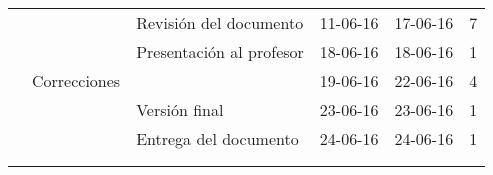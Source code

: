 \begin{table}[H]
{\begin{tabular}{lllccc}
					&							& Revisión del documento							& 11-06-16				& 17-06-16				& 7\\
					&							& Presentación al profesor							& 18-06-16				& 18-06-16				& 1\\ \hline
					& Correcciones				&													& 19-06-16				& 22-06-16				& 4\\
					&							& Versión final										& 23-06-16				& 23-06-16				& 1\\
					&							& Entrega del documento								& 24-06-16				& 24-06-16				& 1\\ \hline
					&							&													& \multicolumn{1}{l}{}	& \multicolumn{1}{l}{}	& \multicolumn{1}{l}{}\\
					&							&													& \multicolumn{1}{l}{}	& \multicolumn{1}{l}{}	& \multicolumn{1}{l}{}
\end{tabular}
}
\end{table}
